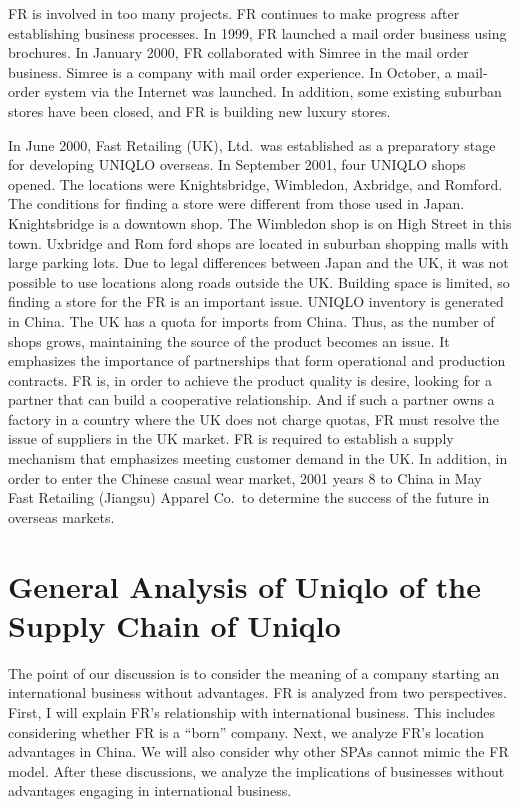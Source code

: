 \documentclass[12pt,a4paper]{article}
\begin{document}
FR is involved in too many projects. FR continues to make progress after
establishing business processes. In 1999, FR launched a mail order
business using brochures. In January 2000, FR collaborated with Simree
in the mail order business. Simree is a company with mail order
experience. In October, a mail-order system via the Internet was
launched. In addition, some existing suburban stores have been closed,
and FR is building new luxury stores.

In June 2000, Fast Retailing (UK), Ltd.~was established as a preparatory
stage for developing UNIQLO overseas. In September 2001, four UNIQLO
shops opened. The locations were Knightsbridge, Wimbledon, Axbridge, and
Romford. The conditions for finding a store were different from those
used in Japan. Knightsbridge is a downtown shop. The Wimbledon shop is
on High Street in this town. Uxbridge and Rom ford shops are located in
suburban shopping malls with large parking lots. Due to legal
differences between Japan and the UK, it was not possible to use
locations along roads outside the UK. Building space is limited, so
finding a store for the FR is an important issue. UNIQLO inventory is
generated in China. The UK has a quota for imports from China. Thus, as
the number of shops grows, maintaining the source of the product becomes
an issue. It emphasizes the importance of partnerships that form
operational and production contracts. FR is, in order to achieve the
product quality is desire, looking for a partner that can build a
cooperative relationship. And if such a partner owns a factory in a
country where the UK does not charge quotas, FR must resolve the issue
of suppliers in the UK market. FR is required to establish a supply
mechanism that emphasizes meeting customer demand in the UK. In
addition, in order to enter the Chinese casual wear market, 2001 years 8
to China in May Fast Retailing (Jiangsu) Apparel Co.~to determine the
success of the future in overseas markets.

\hypertarget{general-analysis-of-uniqlo-of-the-supply-chain-of-uniqlo}{%
\section{General Analysis of Uniqlo of the Supply Chain of
Uniqlo}\label{general-analysis-of-uniqlo-of-the-supply-chain-of-uniqlo}}

The point of our discussion is to consider the meaning of a company
starting an international business without advantages. FR is analyzed
from two perspectives. First, I will explain FR's relationship with
international business. This includes considering whether FR is a
``born'' company. Next, we analyze FR's location advantages in China. We
will also consider why other SPAs cannot mimic the FR model. After these
discussions, we analyze the implications of businesses without
advantages engaging in international business.
\end{document}
